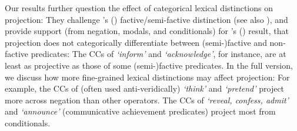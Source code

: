 \documentclass[11pt, a4paper]{article}
\newcommand{\posscite}[1]{\citeauthor{#1}'s (\citeyear{#1})}
\begin{document}
	Our results further question the effect of categorical lexical distinctions on projection: They challenge \posscite{karttunen_observations_1971} factive/semi-factive distinction (see also \citealt{beaver_have_2010,sieker_projective_2022}), and provide support (from negation, modals, and conditionals) for \posscite{degen_are_2022} result, that projection does not categorically differentiate between (semi-)factive and non-factive predicates: The CCs of \emph{\lq inform\rq} and \emph{\lq acknowledge\rq}, for instance, are at least as projective as those of some (semi-)factive predicates.
	In the full version, we discuss how more fine-grained lexical distinctions may affect projection: For example, the CCs of (often used anti-veridically) \emph{\lq think\rq} and \emph{\lq pretend\rq} project more across negation than other operators. The CCs of \emph{\lq reveal, confess, admit\rq} and \emph{\lq announce\rq} (communicative achievement predicates) project most from conditionals.
	

\end{document}
